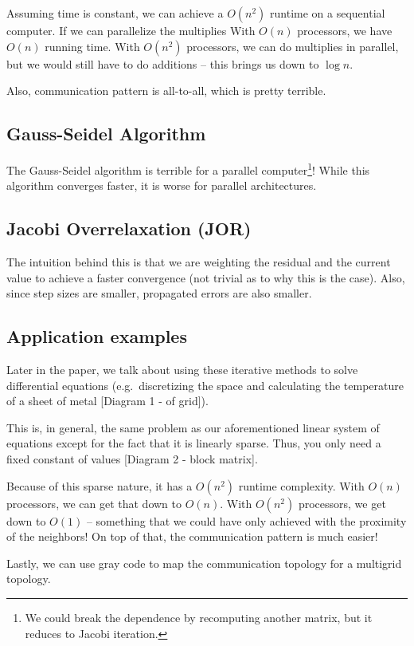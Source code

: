 Assuming time is constant, we can achieve a \( O (n^2) \) runtime on a sequential computer. If we can parallelize the multiplies With \( O(n) \) processors, we have \( O(n) \) running time. With \( O(n^2) \) processors, we can do multiplies in parallel, but we would still have to do additions -- this brings us down to \( \log{n} \).

Also, communication pattern is all-to-all, which is pretty terrible.

\subsection{Gauss-Seidel Algorithm}

The Gauss-Seidel algorithm is terrible for a parallel computer\footnote{We could break the dependence by recomputing another matrix, but it reduces to Jacobi iteration.}! While this algorithm converges faster, it is worse for parallel architectures.

\subsection{Jacobi Overrelaxation (JOR)}
The intuition behind this is that we are weighting the residual and the current value to achieve a faster convergence (not trivial as to why this is the case). Also, since step sizes are smaller, propagated errors are also smaller.

\subsection{Application examples}

Later in the paper, we talk about using these iterative methods to solve differential equations (e.g.\ discretizing the space and calculating the temperature of a sheet of metal [Diagram 1 - of grid]).

This is, in general, the same problem as our aforementioned linear system of equations except for the fact that it is linearly sparse. Thus, you only need a fixed constant of values [Diagram 2 - block matrix].

Because of this sparse nature, it has a \( O(n^2) \) runtime complexity. With \( O(n) \) processors, we can get that down to \( O(n) \). With \( O(n^2) \) processors, we get down to \( O(1) \) -- something that we could have only achieved with the proximity of the neighbors! On top of that, the communication pattern is much easier!

Lastly, we can use gray code to map the communication topology for a multigrid topology.

